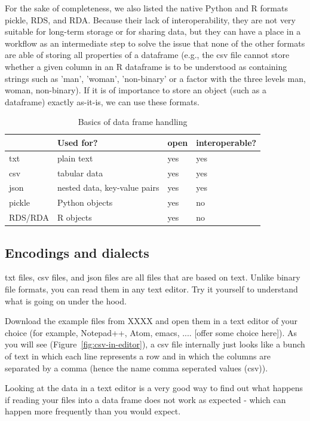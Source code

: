 For the sake of completeness, we also listed the native Python and R formats pickle, RDS, and RDA. Because their lack of interoperability, they are not very suitable for long-term storage or for sharing data, but they can have a place in a workflow as an intermediate step to solve the issue that none of the other formats are able of storing all properties of a dataframe (e.g., the csv file cannot store whether a given column in an R dataframe is to be understood as containing strings such as 'man', 'woman', 'non-binary' or a factor with the three levels man, woman, non-binary). If it is of importance to store an object (such as a dataframe) exactly as-it-is, we can use these formats. 

\begin{table}[]
\caption{Basics of data frame handling}
\label{tab:fileformats}
\begin{tabular}{@{}llll@{}}
\toprule
        & Used for?             & open   & interoperable?\\ \midrule
txt     & plain text            &yes & yes            \\
csv     & tabular data          & yes & yes            \\
json    & nested data, key-value pairs   & yes & yes             \\ 
pickle  & Python objects        & yes & no     \\ 
RDS/RDA & R objects             & yes & no \\ \bottomrule
\end{tabular}
\end{table}


\subsection{Encodings and dialects}
txt files, csv files, and json files are all files that are based on text. Unlike binary file formats, you can read them in any text editor. Try it yourself to understand what is going on under the hood. 

Download the example files from XXXX and open them in a text editor of your choice (for example, Notepad++, Atom, emacs, .... [offer some choice here]). 
As you will see (Figure~\ref{fig:csv-in-editor}), a csv file internally just looks like a bunch of text in which each line represents a row and in which the columns are separated by a comma (hence the name comma seperated values (csv)).

Looking at the data in a text editor is a very good way to find out what happens if reading your files into a data frame does not work as expected - which can happen more frequently than you would expect.

